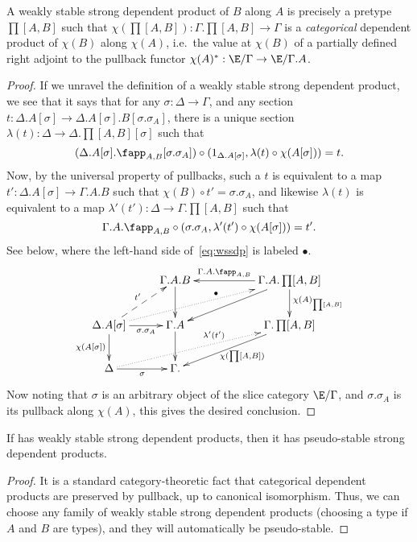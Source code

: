\documentclass{amsart}
\begin{document}
\begin{lem}
  A weakly stable strong dependent product of $B$ along $A$ is precisely a pretype $\prod[A,B]$ such that $\chi(\prod[A,B]):\Gamma.\prod[A,B] \to \Gamma$ is a \emph{categorical} dependent product of $\chi(B)$ along $\chi(A)$, i.e.\ the value at $\chi(B)$ of a partially defined right adjoint to the pullback functor $\chi(A)^* : \E/\Gamma \to \E/\Gamma.A$.
\end{lem}
\begin{proof}
  If we unravel the definition of a weakly stable strong dependent product, we see that it says that for any $\sigma:\Delta\to\Gamma$, and any section $t:\Delta.A[\sigma] \to \Delta.A[\sigma].B[\sigma.\sigma_A]$, there is a unique section $\lambda(t) : \Delta \to \Delta.\prod[A,B][\sigma]$ such that
  \[ (\Delta.A[\sigma].\fapp_{A,B}[\sigma.\sigma_A]) \circ (1_{\Delta.A[\sigma]},\lambda(t) \circ \chi(A[\sigma])) = t. \]
  Now, by the universal property of pullbacks, such a $t$ is equivalent to a map $t':\Delta.A[\sigma] \to \Gamma.A.B$ such that $\chi(B) \circ t' = \sigma.\sigma_A$, and likewise $\lambda(t)$ is equivalent to a map $\lambda'(t'):\Delta \to \Gamma.\prod[A,B]$ such that
  \begin{equation}
    \Gamma.A.\fapp_{A,B} \circ {(\sigma.\sigma_A, \lambda'(t')\circ \chi(A[\sigma]))} = t'.\label{eq:wssdp}
  \end{equation}
  See below, where the left-hand side of~\eqref{eq:wssdp} is labeled $\bullet$.
  \begin{equation}
    \vcenter{\xymatrix{
        & \Gamma.A.B \ar[d]  &&
        \Gamma.A.\prod[A,B] \ar[dll] \ar[ll]_-{\Gamma.A.\fapp_{A,B}} \ar[d]^{\chi(A)_{\prod[A,B]}} \\
        \Delta.A[\sigma]\ar[r]_-{\sigma.\sigma_A}
        \ar@{.>}[urrr]^(.6){\bullet}
        \ar[d]_{\chi(A[\sigma])} \ar@{-->}[ur]^{t'} &
        \Gamma.A\ar[d] &&
        \Gamma.\prod[A,B] \ar[dll]^{\chi(\prod[A,B])} \\
        \Delta \ar[r]_\sigma \ar@{.>}[urrr]^(.6){\lambda'(t')} &
        \Gamma.
      }}
  \end{equation}
  Now noting that $\sigma$ is an arbitrary object of the slice category $\E/\Gamma$, and $\sigma.\sigma_A$ is its pullback along $\chi(A)$, this gives the desired conclusion.
\end{proof}

\begin{lem}
  If \E has weakly stable strong dependent products, then it has pseudo-stable strong dependent products.
\end{lem}
\begin{proof}
  It is a standard category-theoretic fact that categorical dependent products are preserved by pullback, up to canonical isomorphism.
  Thus, we can choose any family of weakly stable strong dependent products (choosing a type if $A$ and $B$ are types), and they will automatically be pseudo-stable.
\end{proof}
\end{document}
